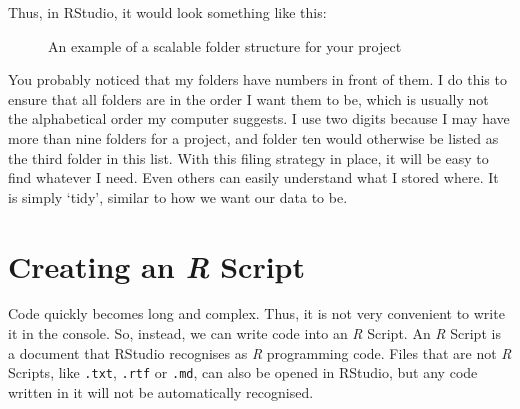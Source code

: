 \documentclass[
  letterpaper,
]{krantz}
\begin{document}
Thus, in RStudio, it would look something like this:

\begin{figure}


\caption{\label{fig-folder-structure}An example of a scalable folder
structure for your project}

\end{figure}%

You probably noticed that my folders have numbers in front of them. I do
this to ensure that all folders are in the order I want them to be,
which is usually not the alphabetical order my computer suggests. I use
two digits because I may have more than nine folders for a project, and
folder ten would otherwise be listed as the third folder in this list.
With this filing strategy in place, it will be easy to find whatever I
need. Even others can easily understand what I stored where. It is
simply `tidy', similar to how we want our data to be.

\section{\texorpdfstring{Creating an \emph{R}
Script}{Creating an R Script}}\label{sec-creating-an-r-script}

Code quickly becomes long and complex. Thus, it is not very convenient
to write it in the console. So, instead, we can write code into an
\emph{R} Script. An \emph{R} Script is a document that RStudio
recognises as \emph{R} programming code. Files that are not \emph{R}
Scripts, like \texttt{.txt}, \texttt{.rtf} or \texttt{.md}, can also be
opened in RStudio, but any code written in it will not be automatically
recognised.
\end{document}
